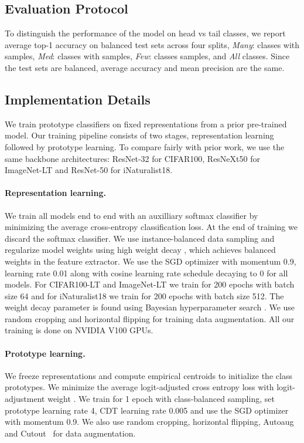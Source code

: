\documentclass{article}
\begin{document}
\subsection{Evaluation Protocol}
To distinguish the performance of the model on head vs tail classes, we report average top-1 accuracy on balanced test sets across four splits, \emph{Many}: classes with  samples, \emph{Med}: classes with  samples, \emph{Few}: classes  samples, and \emph{All} classes. Since the test sets are balanced, average accuracy and mean precision are the same. 

\subsection{Implementation Details}
We train prototype classifiers on fixed representations from a prior pre-trained model. Our training pipeline consists of two stages, representation learning followed by prototype learning. To compare fairly with prior work, we use the same backbone architectures: ResNet-32 for CIFAR100, ResNeXt50 for ImageNet-LT and ResNet-50 for iNaturalist18. 

\paragraph{Representation learning.} We train all models end to end with an auxilliary softmax classifier by minimizing the average cross-entropy classification loss. At the end of training we discard the softmax classifier. We use instance-balanced data sampling \cite{kang2019decoupling} and regularize model weights using high weight decay \cite{alshammari2022long}, which achieves balanced weights in the feature extractor.  We use the SGD optimizer with momentum 0.9, learning rate 0.01 along with cosine learning rate schedule \cite{loshchilovsgdr} decaying to 0 for all models. For CIFAR100-LT and ImageNet-LT we train for 200 epochs with batch size 64 and for iNaturalist18 we train for 200 epochs with batch size 512. The weight decay parameter is found using Bayesian hyperparameter search \cite{nogueira2014bayesian}. We use random cropping and horizontal flipping for training data augmentation. All our training is done on NVIDIA V100 GPUs. 

\paragraph{Prototype learning.} We freeze representations and compute empirical centroids to initialize the class prototypes. We minimize the average logit-adjusted cross entropy loss with logit-adjustment weight . We train for 1 epoch with class-balanced sampling, set prototype learning rate 4, CDT learning rate 0.005 and use the SGD optimizer with momentum 0.9. We also use random cropping, horizontal flipping, Autoaug~\cite{cubuk2018autoaugment} and Cutout~\cite{devries2017cutout} for data augmentation.  
\end{document}
